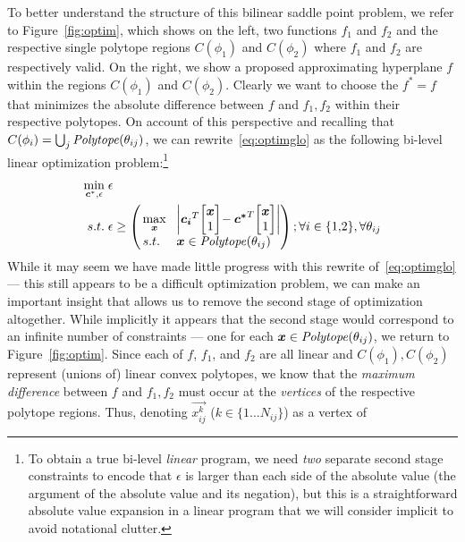 To better understand the structure of this bilinear saddle point
problem, we refer to Figure~\ref{fig:optim}, which shows on the
left, two functions $f_1$ and $f_2$ and the respective single polytope
regions $C(\phi_1)$ and $C(\phi_2)$ where $f_1$ and $f_2$ are
respectively valid.  On the right, we show a proposed approximating
hyperplane $f$ within the regions $C(\phi_1)$ and $C(\phi_2)$.
Clearly we want to choose the $f^*=f$ that minimizes the absolute
difference between $f$ and $f_1,f_2$ within their respective polytopes.
On account of this perspective and recalling that $C(\phi_i)
= \bigcup_j \mathit{Polytope}(\theta_{ij})$, we can rewrite~\eqref{eq:optimglo} as
the following bi-level linear optimization problem:\footnote{
To obtain a true bi-level \emph{linear} program, we need \emph{two} separate
second stage constraints to encode that $\epsilon$ is larger than each
side of the absolute value (the argument of the absolute value and its
negation), but this is a straightforward absolute value expansion in a
linear program that we will consider implicit to avoid notational clutter.}
\begin{align}
\min_{\vec{c}^*,\epsilon} \; & \epsilon \label{eq:bilevel} \\
s.t. \;       & \epsilon \geq \left( \!\!
  \begin{array}{ll}
  \max\limits_{\vec{x}} \! & \left| \vec{c_i}^T \! \mb \vec{x}\\1 \me \! - \vec{c^*}^T \! \mb \vec{x}\\1 \me \right| \\ 
  s.t. \;              \! & \vec{x} \in \PT(\theta_{ij})
  \end{array} \!\!\! \right); \forall i \in \{ 1,\!2 \}, \forall \theta_{ij} \nonumber
\end{align}
While it may seem we have made little progress with this rewrite
of~\eqref{eq:optimglo} --- this still appears to be a difficult
optimization problem, we can make an important insight that allows
us to remove the second stage of optimization altogether.  While
implicitly it appears that the second stage would correspond to an
infinite number of constraints --- one for each
$\boldsymbol{x} \in \mathit{Polytope}(\theta_{ij})$, we return to Figure~\ref{fig:optim}.
Since each of $f$, $f_1$, and $f_2$ are all linear and
$C(\phi_1),C(\phi_2)$ represent (unions of) linear convex polytopes,
we know that the \emph{maximum difference} between $f$ and $f_1,f_2$ must
occur at the \emph{vertices} of the respective polytope regions.
Thus, denoting $\vec{x_{ij}^k}$ ($k \in \{ 1 \ldots N_{ij} \}$) as a vertex of
